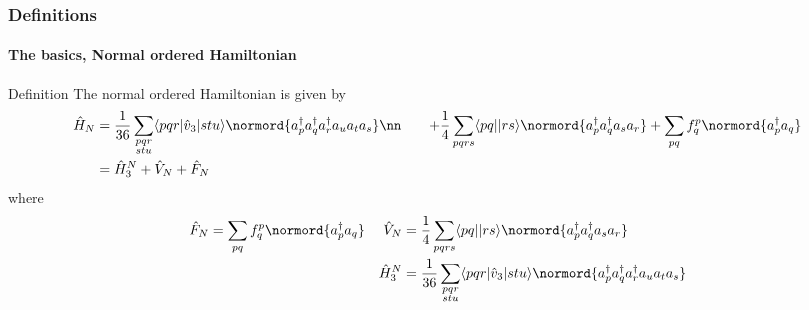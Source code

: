\documentclass[compress]{beamer}
\newcommand*{\ket}[1]{|#1\rangle}
\newcommand*{\bra}[1]{\langle#1|}
\newcommand{\element}[3]
        {\bra{#1}#2\ket{#3}}
\begin{document}
\begin{frame}[fragile]
    \frametitle{Definitions}
    \framesubtitle{The basics, Normal ordered Hamiltonian}

    \small
    \begin{block}{Definition}
    The normal ordered Hamiltonian is given by
    \begin{align*}
        \hat{H}_N &= 
            \frac{1}{36} \sum_{\substack{
                        pqr \\
                        stu}}
                 \element{pqr}{\hat{v}_3}{stu} 
                    \normord{a^\dagger_p a^\dagger_q a^\dagger_r a_u a_t a_s} \nn
        & \quad + 
            \frac{1}{4} \sum_{pqrs} \bra{pq}\ket{rs} \normord{a^\dagger_p a^\dagger_q a_s  a_r} 
            + \sum_{pq} f_q^p \normord{a^\dagger_p a_q} \\
        &= \hat{H}_3^N + \hat{V}_N + \hat{F}_N
    \end{align*}
    where
    \begin{subequations}
    \begin{align*}
        \hat{F}_N &= \sum_{pq} f_q^p \normord{a^\dagger_p a_q} &
        \hat{V}_N &= \frac{1}{4} \sum_{pqrs} \bra{pq}\ket{rs} \normord{a^\dagger_p a^\dagger_q a_s  a_r} \\
        && \hat{H}_3^N &= 
                \frac{1}{36} \sum_{\substack{
                            pqr \\
                            stu}}
                     \element{pqr}{\hat{v}_3}{stu} 
                        \normord{a^\dagger_p a^\dagger_q a^\dagger_r a_u a_t a_s}
    \end{align*}
    \end{subequations}
    \end{block}
\end{frame}
\end{document}
